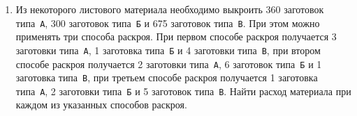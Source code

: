 \documentclass[a5paper,10pt]{extarticle}
\begin{document}
\begin{enumerate}
\begin{enumerate*}
\end{enumerate*}
\item
	Из  некоторого  листового  материала  необходимо  выкроить  360  заготовок типа~\texttt{А},  300  заготовок  типа~\texttt{Б}  и  675  заготовок  типа~\texttt{В}.  При  этом можно применять  три  способа  раскроя.  При  первом  способе  раскроя  получается  3 заготовки типа~\texttt{А}, 1 заготовка типа~\texttt{Б} и 4 заготовки типа~\texttt{В}, при втором способе раскроя получается 2 заготовки типа~\texttt{А}, 6 заготовок типа~\texttt{Б} и 1 заготовка  типа~\texttt{В},  при  третьем  способе  раскроя  получается  1  заготовка  типа~\texttt{А},  2  заготовки типа~\texttt{Б} и 5 заготовок типа~\texttt{В}. Найти расход материала при каждом из указанных способов раскроя.


\end{enumerate}
\end{document}
